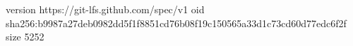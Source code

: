 version https://git-lfs.github.com/spec/v1
oid sha256:b9987a27deb0982dd5f1f8851cd76b08f19c150565a33d1c73cd60d77edc6f2f
size 5252

